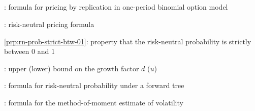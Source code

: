 \subsection*{}
\item {}: formula for pricing by replication in one-period binomial option model
\item {}: risk-neutral pricing formula
\item \cref{prp:rn-prob-strict-btw-01}: property that the risk-neutral probability is strictly between 0 and 1
\item {}: upper (lower) bound on the growth factor \(d\) (\(u\))
\item {}: formula for risk-neutral probability under a forward tree
\item {}: formula for the method-of-moment estimate of volatility
